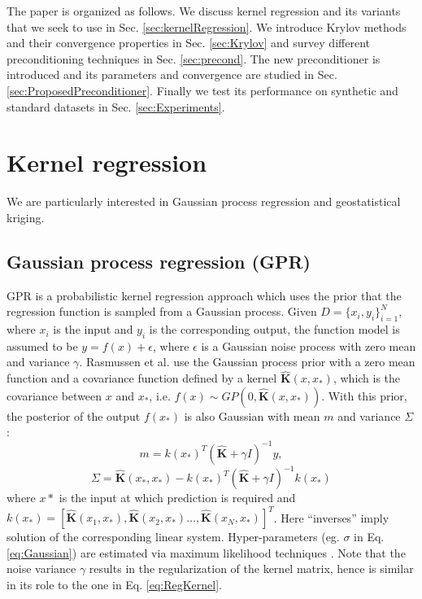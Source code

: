 \documentclass[10pt,journal,letterpaper,compsoc]{IEEEtran}
\begin{document}
The paper is organized as follows. We discuss kernel regression and its variants that we seek to use in Sec. \ref{sec:kernelRegression}. We introduce Krylov methods and their convergence properties in Sec. \ref{sec:Krylov} and survey different preconditioning techniques in Sec. \ref{sec:precond}. The new preconditioner is introduced and its parameters and convergence are studied in Sec. \ref{sec:ProposedPreconditioner}. Finally we test its performance on synthetic and standard datasets in Sec. \ref{sec:Experiments}.

\section{Kernel regression\label{sec:kernelRegression}}
We are particularly interested in Gaussian process regression and geostatistical kriging.

\subsection{Gaussian process regression (GPR) \cite{GPML_Rasmussen} \label{sec:GPR}}
GPR is a probabilistic kernel regression approach which uses the prior that the regression function is sampled from a Gaussian process. Given $D=\{x_i,y_i\}_{i=1}^N$, where $x_i$ is the input and $y_i$ is the corresponding output, the function model is assumed to be $y=f(x)+\epsilon$, where $\epsilon$ is a Gaussian noise process with zero mean and variance $\gamma$. Rasmussen et al. \cite{GPML_Rasmussen} use the Gaussian process prior with a zero mean function and a covariance function defined by a kernel $\mathbf{\hat{K}}(x,x_\ast)$, which is the covariance between $x$ and $x_\ast$, i.e. $f(x)\sim GP(0,\mathbf{\hat{K}}(x,x_\ast))$. With this prior, the posterior of the output $f(x_\ast)$ is also Gaussian with mean $m$ and variance $\Sigma$:
\begin{equation}m = k(x_\ast)^{T}(\mathbf{\hat{K}}+\gamma I)^{-1}y, \label{eq:GPR_mean}\end{equation}
\begin{equation}\Sigma = \mathbf{\hat{K}}(x_\ast,x_\ast)-k(x_{\ast})^{T}(\mathbf{\hat{K}}+\gamma I)^{-1}k(x_{\ast})\end{equation}
where $x\ast$ is the input at which prediction is required and $k(x_\ast)=[\mathbf{\hat{K}}(x_1,x_\ast),\mathbf{\hat{K}}(x_2,x_\ast)\ldots,\mathbf{\hat{K}}(x_N,x_\ast)]^T$. Here ``inverses'' imply solution of the corresponding linear system. Hyper-parameters (eg. $\sigma$ in Eq. \ref{eq:Gaussian}) are estimated via maximum likelihood techniques \cite{GPML_Rasmussen}. Note that the noise variance $\gamma$ results in the regularization of the kernel matrix, hence is similar in its role to the one in Eq. \ref{eq:RegKernel}.
\end{document}
